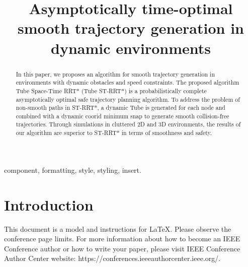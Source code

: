 \documentclass[conference]{IEEEtran}
\begin{document}
    \title
    {
        Asymptotically time-optimal smooth trajectory generation in dynamic environments\\
    }

    \author
    {
        \and
    }

    \maketitle

    \begin{abstract}
        In this paper, we proposes an algorithm for smooth trajectory generation in environments with dynamic obstacles and speed constraints. The proposed algorithm Tube Space-Time RRT* (Tube ST-RRT*) is a probabilistically complete asymptotically optimal safe trajectory planning algorithm. To address the problem of non-smooth paths in ST-RRT*, a dynamic Tube is generated for each node and combined with a dynamic coorid minimum snap to generate smooth collision-free trajectories. Through simulations in cluttered 2D and 3D environments, the results of our algorithm are superior to ST-RRT* in terms of smoothness and safety.
    \end{abstract}

    \begin{IEEEkeywords}
        component, formatting, style, styling, insert.
    \end{IEEEkeywords}

    \section{Introduction}
    This document is a model and instructions for \LaTeX.
    Please observe the conference page limits. For more information about how to become an IEEE Conference author or how to write your paper, please visit   IEEE Conference Author Center website: https://conferences.ieeeauthorcenter.ieee.org/.
\end{document}
